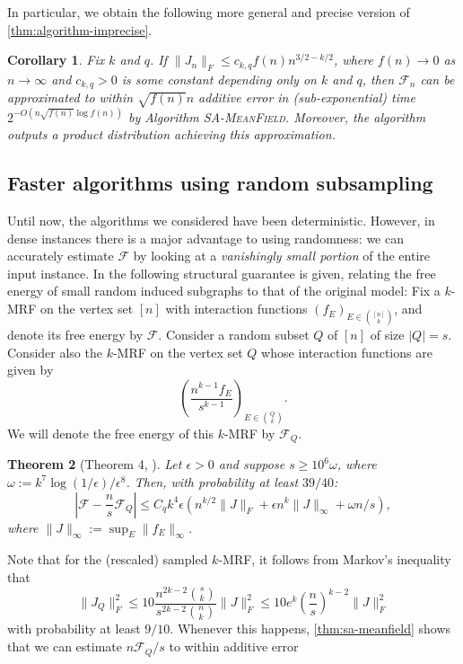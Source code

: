 \documentclass[11pt, oneside, english]{article}
\newcommand{\F}{\mathcal{F}}
\newtheorem{theorem}{Theorem}[section]
\newtheorem{corollary}[theorem]{Corollary}
\theoremstyle{definition}
\theoremstyle{plain}
\begin{document}
In particular, we obtain the following more general and precise version of \cref{thm:algorithm-imprecise}.
\begin{corollary}
\label{corollary:algorithm-precise}
Fix $k$ and $q$. If $\|J_n\|_F \leq c_{k,q}f(n)n^{3/2 - k/2}$, where $f(n) \to 0$ as $n \to \infty$ and $c_{k,q}>0$ is some constant depending only on $k$ and $q$, then $\F_n$ can be approximated to within $\sqrt{f(n)} n$ additive error in (sub-exponential) time $2^{-O\left(n\sqrt{f(n)}\log{f(n)}\right)}$ by Algorithm \textsc{SA-MeanField}. Moreover, the algorithm outputs a product distribution achieving this approximation.
\end{corollary}
\subsection{Faster algorithms using random subsampling}
Until now, the algorithms we considered have been deterministic. However, in dense instances there is a major advantage to using randomness: we can accurately estimate $\F$ by looking at a \emph{vanishingly small portion} of the entire input instance. In \cite{second-paper} the following structural guarantee is given, relating the free energy of small random induced subgraphs to that of the original model: Fix a $k$-MRF on the vertex set $[n]$ with interaction functions $(f_E)_{E\in \binom{[n]}{k}}$, and denote its free energy by $\F$. Consider a random subset $Q$ of $[n]$ of size $|Q|=s$. Consider also the $k$-MRF on the vertex set $Q$ whose interaction functions are given by $$\left(\frac{n^{k-1} f_E}{s^{k-1}}\right)_{E \in \binom{Q}{k}}.$$  
We will denote the free energy of this $k$-MRF by $\F_Q$.
\begin{theorem}[Theorem 4, \cite{second-paper}]
Let $\epsilon > 0$ and suppose $s \ge 10^6\omega$, where $\omega:= k^7\log(1/\epsilon)/\epsilon^{8}$. 
Then, with probability at least $39/40$:
$$\left|\F - \frac{n}{s}\F_Q\right| \leq C_q k^4 \epsilon  \left(n^{k/2}\|J\|_F + \epsilon n^{k} \|J\|_{\infty} + \omega n/s\right),$$
where $\|J\|_{\infty} := \sup_E \|f_E\|_{\infty}$.
\end{theorem}
Note that for the (rescaled) sampled $k$-MRF, it follows from Markov's inequality that 
$$\|J_Q\|^{2}_F \leq 10\frac{n^{2k-2}\binom{s}{k}}{s^{2k-2}\binom{n}{k}}\|J\|^{2}_F \leq 10e^k\left(\frac{n}{s}\right)^{k-2} \|J\|^{2}_F$$ with probability at least $9/10$. Whenever this happens, \cref{thm:sa-meanfield} shows that we can estimate $n\F_Q/s$ to within additive error 
\end{document}
